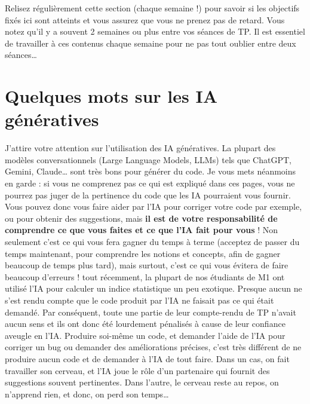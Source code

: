 \documentclass[
  a4paper,
  DIV=11,
  numbers=noendperiod,
  oneside]{scrreprt}
\begin{document}
\begin{tcolorbox}[enhanced jigsaw, coltitle=black, toprule=.15mm, opacityback=0, breakable, colback=white, opacitybacktitle=0.6, colframe=quarto-callout-warning-color-frame, leftrule=.75mm, rightrule=.15mm, titlerule=0mm, bottomtitle=1mm, toptitle=1mm, arc=.35mm, title=\textcolor{quarto-callout-warning-color}{\faExclamationTriangle}\hspace{0.5em}{Attention au retard}, colbacktitle=quarto-callout-warning-color!10!white, bottomrule=.15mm, left=2mm]

Relisez régulièrement cette section (chaque semaine !) pour savoir si
les objectifs fixés ici sont atteints et vous assurez que vous ne prenez
pas de retard. Vous notez qu'il y a souvent 2 semaines ou plus entre vos
séances de TP. Il est essentiel de travailler à ces contenus chaque
semaine pour ne pas tout oublier entre deux séances\ldots{}

\end{tcolorbox}

\section*{Quelques mots sur les IA
génératives}\label{quelques-mots-sur-les-ia-guxe9nuxe9ratives}


J'attire votre attention sur l'utilisation des IA génératives. La
plupart des modèles conversationnels (Large Language Models, LLMs) tels
que ChatGPT, Gemini, Claude\ldots{} sont très bons pour générer du code.
Je vous mets néanmoins en garde : si vous ne comprenez pas ce qui est
expliqué dans ces pages, vous ne pourrez pas juger de la pertinence du
code que les IA pourraient vous fournir. Vous pouvez donc vous faire
aider par l'IA pour corriger votre code par exemple, ou pour obtenir des
suggestions, mais \textbf{il est de votre responsabilité de comprendre
ce que vous faites et ce que l'IA fait pour vous} ! Non seulement c'est
ce qui vous fera gagner du temps à terme (acceptez de passer du temps
maintenant, pour comprendre les notions et concepts, afin de gagner
beaucoup de temps plus tard), mais surtout, c'est ce qui vous évitera de
faire beaucoup d'erreurs ! tout récemment, la plupart de nos étudiants
de M1 ont utilisé l'IA pour calculer un indice statistique un peu
exotique. Presque aucun ne s'est rendu compte que le code produit par
l'IA ne faisait pas ce qui était demandé. Par conséquent, toute une
partie de leur compte-rendu de TP n'avait aucun sens et ils ont donc été
lourdement pénalisés à cause de leur confiance aveugle en l'IA. Produire
soi-même un code, et demander l'aide de l'IA pour corriger un bug ou
demander des améliorations précises, c'est très différent de ne produire
aucun code et de demander à l'IA de tout faire. Dans un cas, on fait
travailler son cerveau, et l'IA joue le rôle d'un partenaire qui fournit
des suggestions souvent pertinentes. Dans l'autre, le cerveau reste au
repos, on n'apprend rien, et donc, on perd son temps\ldots{}
\end{document}
